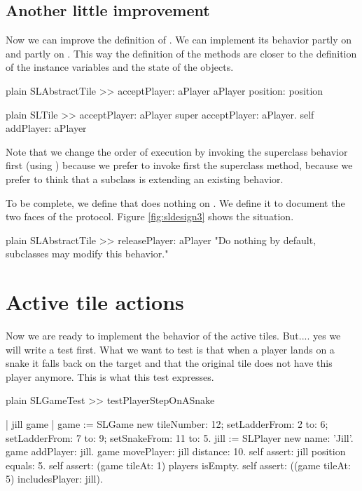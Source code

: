 \documentclass[10pt,twoside,english]{_support/latex/sbabook/sbabook}
\begin{document}
\subsection{Another little improvement}
Now we can improve the definition of . We can implement its behavior partly on  and partly on . This way the definition of the methods are closer to the definition of the instance variables and the state of the objects.

\begin{displaycode}{plain}
SLAbstractTile >> acceptPlayer: aPlayer
	aPlayer position: position
\end{displaycode}

\begin{displaycode}{plain}
SLTile >> acceptPlayer: aPlayer
	super acceptPlayer: aPlayer.
	self addPlayer: aPlayer
\end{displaycode}

Note that we change the order of execution by invoking the superclass behavior first (using ) because we prefer to invoke first the superclass method, because we prefer to think that a subclass is extending an existing behavior. 

To be complete, we define that  does nothing on . We define it to document the two faces of the protocol.
Figure \ref{fig:sldesign3} shows the situation. 

\begin{displaycode}{plain}
SLAbstractTile >> releasePlayer: aPlayer
	"Do nothing by default, subclasses may modify this behavior."
\end{displaycode}
\section{Active tile actions}
Now we are ready to implement the behavior of the active tiles. But.... yes we will write a test first.  What we want to test is that when a player lands on a snake it falls back on the target and that the original tile does not have this player anymore. This is what this test expresses.

\begin{displaycode}{plain}
SLGameTest >> testPlayerStepOnASnake
	
	| jill game |
	game := SLGame new
			tileNumber: 12;
			setLadderFrom: 2 to: 6;
			setLadderFrom: 7 to: 9;
			setSnakeFrom: 11 to: 5.
	jill := SLPlayer new name: 'Jill'.
	game addPlayer: jill.
	game movePlayer: jill distance: 10.
	self assert: jill position equals: 5.
	self assert: (game tileAt: 1) players isEmpty.
	self assert: ((game tileAt: 5) includesPlayer: jill).
\end{displaycode}
\end{document}
